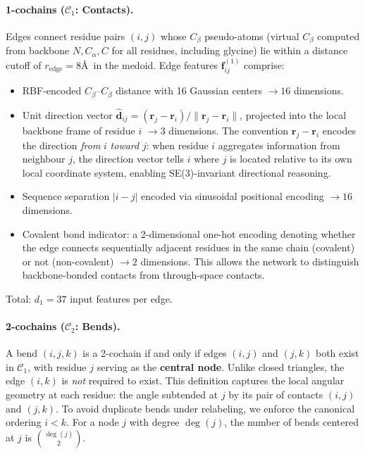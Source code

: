 \documentclass{article}
\begin{document}
\paragraph{1-cochains ($\mathcal{C}_1$: Contacts).} Edges connect residue pairs $(i, j)$ whose $C_\beta$ pseudo-atoms (virtual $C_\beta$ computed from backbone $N, C_\alpha, C$ for all residues, including glycine) lie within a distance cutoff of $r_{\text{edge}} = 8$\AA\ in the medoid. Edge features $\mathbf{f}_{ij}^{(1)}$ comprise:
\begin{itemize}
    \item RBF-encoded $C_\beta$--$C_\beta$ distance with 16 Gaussian centers $\rightarrow 16$ dimensions.
    \item Unit direction vector $\hat{\mathbf{d}}_{ij} = (\mathbf{r}_j - \mathbf{r}_i) / \|\mathbf{r}_j - \mathbf{r}_i\|$, projected into the local backbone frame of residue $i$ $\rightarrow 3$ dimensions. The convention $\mathbf{r}_j - \mathbf{r}_i$ encodes the direction \emph{from} $i$ \emph{toward} $j$: when residue $i$ aggregates information from neighbour $j$, the direction vector tells $i$ where $j$ is located relative to its own local coordinate system, enabling SE(3)-invariant directional reasoning.
    \item Sequence separation $|i - j|$ encoded via sinusoidal positional encoding $\rightarrow 16$ dimensions.
    \item Covalent bond indicator: a 2-dimensional one-hot encoding denoting whether the edge connects sequentially adjacent residues in the same chain (covalent) or not (non-covalent) $\rightarrow 2$ dimensions. This allows the network to distinguish backbone-bonded contacts from through-space contacts.
\end{itemize}
Total: $d_1 = 37$ input features per edge.

\paragraph{2-cochains ($\mathcal{C}_2$: Bends).} A bend $(i, j, k)$ is a 2-cochain if and only if edges $(i, j)$ and $(j, k)$ both exist in $\mathcal{C}_1$, with residue $j$ serving as the \textbf{central node}. Unlike closed triangles, the edge $(i, k)$ is \emph{not} required to exist. This definition captures the local angular geometry at each residue: the angle subtended at $j$ by its pair of contacts $(i, j)$ and $(j, k)$. To avoid duplicate bends under relabeling, we enforce the canonical ordering $i < k$. For a node $j$ with degree $\deg(j)$, the number of bends centered at $j$ is $\binom{\deg(j)}{2}$.
\end{document}
